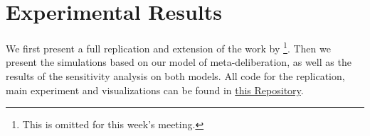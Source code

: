 \newpage
\chapter{Experimental Results}
\label{experiment_results}
We first present a full replication and extension of the work by
\citet{radDeliberationSinglePeakednessCoherent2021}\footnote{This is omitted
for this week's meeting.}. Then we present the simulations based on our model of
meta-deliberation, as well as the results of the sensitivity analysis on both
models. All code for the replication, main experiment and visualizations can be
found in \href{https://github.com/amirsahrani/master_thesis}{this Repository}.
%
%
%
